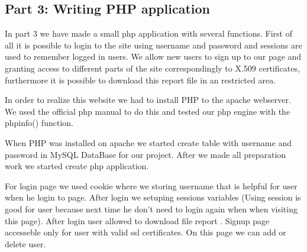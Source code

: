 \subsection {Part 3: Writing PHP application}


\noindent
In part 3 we have made a small php application with several functions. First of all it is possible to login to the site using username and password and sessions are used to remember logged in users. We allow new users to sign up to our page and granting access to different parts of the site correspondingly to X.509 certificates, furthermore it is possible to download this report file in an restricted area. \newline

\noindent
In order to realize this website we had to install PHP to the apache webserver. We used the official php manual to do this \cite{phpinstall}  and tested our php engine with the phpinfo() function.\newline

\noindent
When PHP was installed on apache we started  create table  with username and password  in MySQL DataBase for our project. After we made all preparation work we started create php application. 
\newline

\noindent
For login page we used cookie where we storing username that is helpful for user when he login to page. After login we setuping sessions variables (Using session is good for user because next time he don’t need to login again when when visiting this page). After login user allowed to download file report . Signup page accesseble  only for user with valid ssl certificates. On this page we can add or delete user.
\newline

